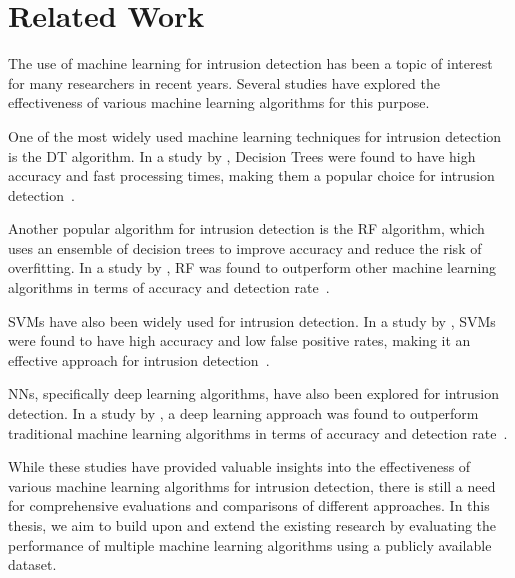 \chapter{Related Work}

The use of machine learning for intrusion detection has been a topic of interest for many researchers in recent years. Several studies have explored the effectiveness of various machine learning algorithms for this purpose.

One of the most widely used machine learning techniques for intrusion detection is the \ac{DT} algorithm. In a study by \citeauthor{wang2017intrusion}, Decision Trees were found to have high accuracy and fast processing times, making them a popular choice for intrusion detection~\autocite{wang2017intrusion}.

Another popular algorithm for intrusion detection is the \ac{RF} algorithm, which uses an ensemble of decision trees to improve accuracy and reduce the risk of overfitting. In a study by \citeauthor{mirza2019random}, \ac{RF} was found to outperform other machine learning algorithms in terms of accuracy and detection rate~\autocite{mirza2019random}.

\acp{SVM} have also been widely used for intrusion detection. In a study by \citeauthor{raza2017intrusion}, \acp{SVM} were found to have high accuracy and low false positive rates, making it an effective approach for intrusion detection~\autocite{raza2017intrusion}.

\acp{NN}, specifically deep learning algorithms, have also been explored for intrusion detection. In a study by \citeauthor{khan2019intrusion}, a deep learning approach was found to outperform traditional machine learning algorithms in terms of accuracy and detection rate~\autocite{khan2019intrusion}.

While these studies have provided valuable insights into the effectiveness of various machine learning algorithms for intrusion detection, there is still a need for comprehensive evaluations and comparisons of different approaches. In this thesis, we aim to build upon and extend the existing research by evaluating the performance of multiple machine learning algorithms using a publicly available dataset.
